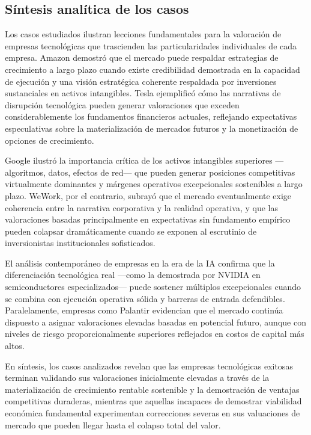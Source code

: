 \subsection{Síntesis analítica de los casos}

Los casos estudiados ilustran lecciones fundamentales para la valoración de empresas tecnológicas que trascienden las particularidades individuales de cada empresa. Amazon demostró que el mercado puede respaldar estrategias de crecimiento a largo plazo cuando existe credibilidad demostrada en la capacidad de ejecución y una visión estratégica coherente respaldada por inversiones sustanciales en activos intangibles. Tesla ejemplificó cómo las narrativas de disrupción tecnológica pueden generar valoraciones que exceden considerablemente los fundamentos financieros actuales, reflejando expectativas especulativas sobre la materialización de mercados futuros y la monetización de opciones de crecimiento.

Google ilustró la importancia crítica de los activos intangibles superiores ---algoritmos, datos, efectos de red--- que pueden generar posiciones competitivas virtualmente dominantes y márgenes operativos excepcionales sostenibles a largo plazo. WeWork, por el contrario, subrayó que el mercado eventualmente exige coherencia entre la narrativa corporativa y la realidad operativa, y que las valoraciones basadas principalmente en expectativas sin fundamento empírico pueden colapsar dramáticamente cuando se exponen al escrutinio de inversionistas institucionales sofisticados.

El análisis contemporáneo de empresas en la era de la IA confirma que la diferenciación tecnológica real ---como la demostrada por NVIDIA en semiconductores especializados--- puede sostener múltiplos excepcionales cuando se combina con ejecución operativa sólida y barreras de entrada defendibles. Paralelamente, empresas como Palantir evidencian que el mercado continúa dispuesto a asignar valoraciones elevadas basadas en potencial futuro, aunque con niveles de riesgo proporcionalmente superiores reflejados en costos de capital más altos.

En síntesis, los casos analizados revelan que las empresas tecnológicas exitosas terminan validando sus valoraciones inicialmente elevadas a través de la materialización de crecimiento rentable sostenible y la demostración de ventajas competitivas duraderas, mientras que aquellas incapaces de demostrar viabilidad económica fundamental experimentan correcciones severas en sus valuaciones de mercado que pueden llegar hasta el colapso total del valor. 
